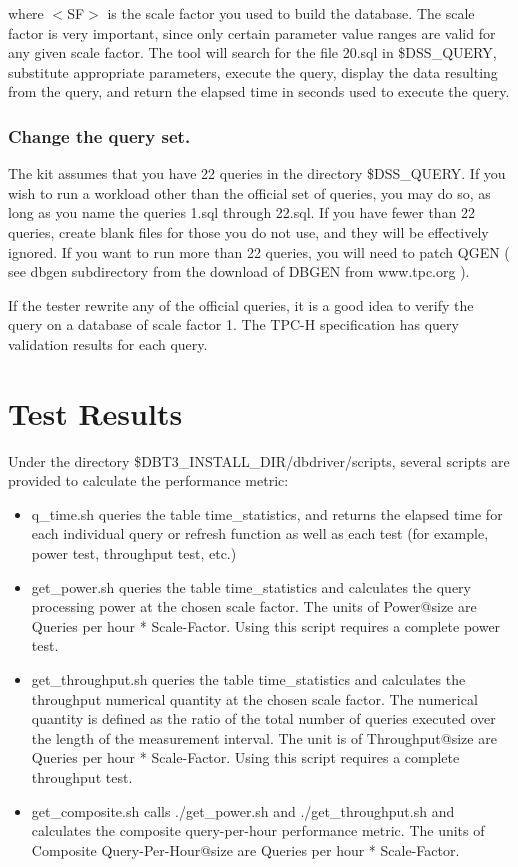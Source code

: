 \documentclass{article}
\begin{document}
\noindent
where $<$SF$>$ is the scale factor you used to build the database.  The
scale factor is very important, since only certain parameter value
ranges are valid for any given scale factor.  The tool will search
for the file 20.sql in  \$DSS\_QUERY, substitute appropriate
parameters, execute the query, display the data resulting from the
query, and return the elapsed time in seconds used to execute the
query.

\subsubsection{Change the query set.}

\noindent
The kit assumes that you have 22 queries in the directory \$DSS\_QUERY.
If you wish to run a workload other than the official set of queries,
you may do so, as long as you name the queries 1.sql through 22.sql.
If you have fewer than 22 queries, create blank files for those you
do not use, and they will be effectively ignored.  If you want to run
more than 22 queries, you will need to patch QGEN ( see dbgen
subdirectory from the download of DBGEN from www.tpc.org ).  

\noindent
If the tester rewrite any of the official queries, it is a good idea
to verify the query on a database of scale factor 1.  The TPC-H
specification has query validation results for each query.

\section{Test Results}

\noindent
Under the directory \$DBT3\_INSTALL\_DIR/dbdriver/scripts, several
scripts are provided to calculate the performance metric: \\
\begin{itemize}
\item q\_time.sh queries the table time\_statistics, and returns the elapsed time for each individual query or refresh function  as well as each test (for example, power test, throughput test, etc.)
\item get\_power.sh  queries the table time\_statistics and calculates the query processing power at the chosen scale factor.  The units of Power@size are Queries per hour * Scale-Factor.  Using this script requires a complete power test.
\item get\_throughput.sh queries the table time\_statistics and calculates the throughput numerical quantity at the chosen scale factor.  The  numerical quantity is defined as the ratio of the total number of queries executed over the length of the measurement interval.  The unit is of Throughput@size are Queries per hour * Scale-Factor.  Using this script requires a complete throughput test.
\item get\_composite.sh calls ./get\_power.sh and ./get\_throughput.sh and calculates the composite query-per-hour performance metric.  The units of Composite Query-Per-Hour@size are Queries per hour * Scale-Factor.
\end{itemize}
\end{document}
